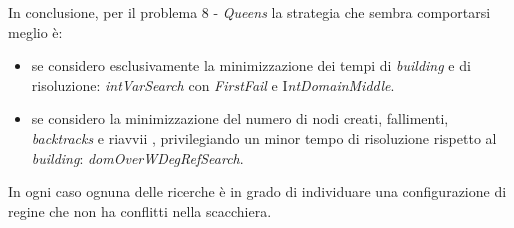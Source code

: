 \noindent 
In conclusione, per il problema $8$ - \textit{Queens} la strategia che sembra comportarsi meglio \`e:
\begin{itemize}
\item se considero esclusivamente la minimizzazione dei tempi di \textit{building} e di risoluzione: \textit{intVarSearch} con \textit{FirstFail} e I\textit{ntDomainMiddle}.
\item se considero la minimizzazione del numero di nodi creati, fallimenti, \textit{backtracks} e riavvii , privilegiando un  minor tempo di risoluzione rispetto al \textit{building}: \textit{domOverWDegRefSearch}.
\end{itemize}
\noindent
In ogni caso ognuna delle ricerche \`e in grado di individuare una configurazione di regine che non ha conflitti nella scacchiera.


